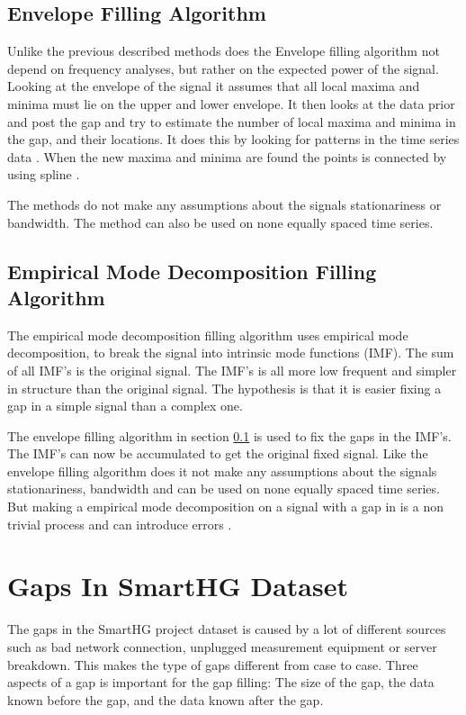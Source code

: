 \subsection{Envelope Filling Algorithm}
\label{T:EGA}
Unlike the previous described methods does the Envelope filling algorithm not depend on frequency analyses, but rather on the expected power of the signal. Looking at the envelope of the signal it assumes that all local maxima and minima must lie on the  upper and lower envelope. It then looks at the data prior and post the gap and try to estimate the number of local maxima and minima in the gap, and their locations. It does this by looking for patterns in the time series data \citep{RefWorks:6}. When the new maxima and minima are found the points is connected by using spline \cite{RefWorks:16}. 

The methods do not make any assumptions about the signals stationariness or bandwidth. The method can also be used on none equally spaced time series. 

\subsection{Empirical Mode Decomposition Filling Algorithm}
The empirical mode decomposition filling algorithm uses empirical mode decomposition, to break the signal into intrinsic mode functions (IMF). The sum of all IMF's is the original signal. The IMF's is all more low frequent and simpler in structure than the original signal. The hypothesis is that it is easier fixing a gap in a simple signal than a complex one. 

The envelope filling algorithm in section \ref{T:EGA} is used to fix the gaps in the IMF's. The IMF's can now be accumulated to get the original fixed signal. Like the envelope filling algorithm does it not make any assumptions about the signals stationariness, bandwidth and can be used on none equally spaced time series. But making a empirical mode decomposition on a signal with a gap in is a non trivial process and can introduce errors \citep{RefWorks:16}. 



\section{Gaps In SmartHG Dataset}
The gaps in the SmartHG project dataset is caused by a lot of different sources such as bad network connection, unplugged measurement equipment or server breakdown. This makes the type of gaps different from case to case. Three aspects of a gap is important for the gap filling: The size of the gap, the data known before the gap, and the data known after the gap. 

